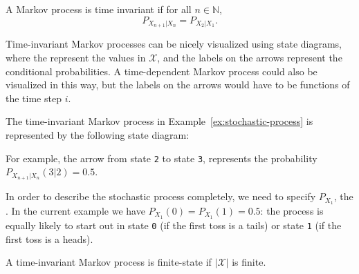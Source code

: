 \begin{definition}
A Markov process is time invariant if for all $n \in \mathbb{N}$,
\[
P_{X_{n+1} | X_n} = P_{X_2 | X_1}.
\]
\end{definition}

Time-invariant Markov processes can be nicely visualized using state diagrams, where the  represent the values in $\mathcal{X}$, and the labels on the arrows represent the conditional probabilities. A time-dependent Markov process could also be visualized in this way, but the labels on the arrows would have to be functions of the time step $i$.

\begin{example}\label{ex:markov-diagram-infinite}
The time-invariant Markov process in Example~\ref{ex:stochastic-process} is represented by the following state diagram:
\begin{center}
\end{center}
For example, the arrow from state \texttt{2} to state \texttt{3}, represents the probability $P_{X_{n+1}|X_{n}}(3|2) = 0.5$.

In order to describe the stochastic process completely, we need to specify $P_{X_1}$, the . In the current example we have $P_{X_1}(0) = P_{X_1}(1) = 0.5$: the process is equally likely to start out in state \texttt{0} (if the first toss is a tails) or state \texttt{1} (if the first toss is a heads).
\end{example}

\begin{definition}
A time-invariant Markov process is finite-state if $|\mathcal{X}|$ is finite.
\end{definition}

